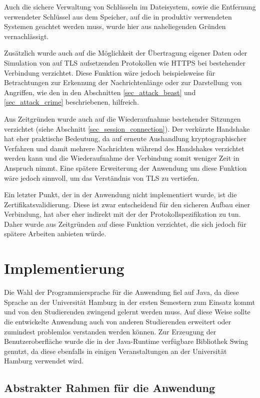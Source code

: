 Auch die sichere Verwaltung von Schlüsseln im Dateisystem, sowie die Entfernung verwendeter Schlüssel aus dem Speicher, auf die in produktiv verwendeten Systemen geachtet werden muss, wurde hier aus naheliegenden Gründen vernachlässigt.

Zusätzlich wurde auch auf die Möglichkeit der Übertragung eigener Daten oder Simulation von auf TLS aufsetzenden Protokollen wie HTTPS bei bestehender Verbindung verzichtet. Diese Funktion wäre jedoch beispielsweise für Betrachtungen zur Erkennung der Nachrichtenlänge oder zur Darstellung von Angriffen, wie den in den Abschnitten \ref{sec_attack_beast} und \ref{sec_attack_crime} beschriebenen, hilfreich.

Aus Zeitgründen wurde auch auf die Wiederaufnahme bestehender Sitzungen verzichtet (siehe Abschnitt \ref{sec_session_connection}). Der verkürzte Handshake hat eher praktische Bedeutung, da auf erneute Aushandlung kryptographischer Verfahren und damit mehrere Nachrichten während des Handshakes verzichtet werden kann und die Wiederaufnahme der Verbindung somit weniger Zeit in Anspruch nimmt. Eine spätere Erweiterung der Anwendung um diese Funktion wäre jedoch sinnvoll, um das Verständnis von TLS zu vertiefen.

Ein letzter Punkt, der in der Anwendung nicht implementiert wurde, ist die Zertifikatsvalidierung. Diese ist zwar entscheidend für den sicheren Aufbau einer Verbindung, hat aber eher indirekt mit der der Protokollspezifikation zu tun. Daher wurde aus Zeitgründen auf diese Funktion verzichtet, die sich jedoch für spätere Arbeiten anbieten würde.

\section{Implementierung}

Die Wahl der Programmiersprache für die Anwendung fiel auf Java, da diese Sprache an der Universität Hamburg in der ersten Semestern zum Einsatz kommt und von den Studierenden zwingend gelernt werden muss. Auf diese Weise sollte die entwickelte Anwendung auch von anderen Studierenden erweitert oder zumindest problemlos verstanden werden können. Zur Erzeugung der Benutzeroberfläche wurde die in der Java-Runtime verfügbare Bibliothek Swing genutzt, da diese ebenfalls in einigen Veranstaltungen an der Universität Hamburg verwendet wird.

\subsection{Abstrakter Rahmen für die Anwendung}

